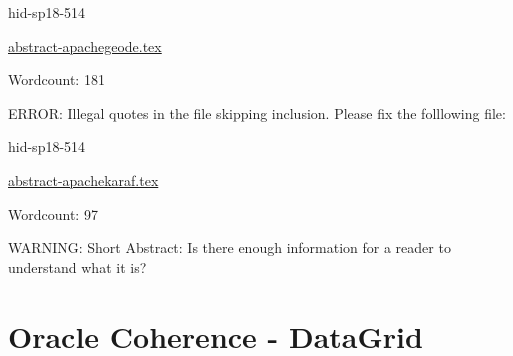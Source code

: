 \begin{IU}

hid-sp18-514

\href{https://github.com/cloudmesh-community/hid-sp18-514/blob/master//technology/abstract-apachegeode.tex}{abstract-apachegeode.tex}

 

Wordcount: 181

\end{IU}

ERROR: Illegal quotes in the file skipping inclusion. Please fix the folllowing file:

\begin{IU}

hid-sp18-514

\href{https://github.com/cloudmesh-community/hid-sp18-514/blob/master//technology/abstract-apachekaraf.tex}{abstract-apachekaraf.tex}

 

Wordcount: 97

WARNING: Short Abstract: Is there enough information for a reader to understand what it is?

\end{IU}

\section{Oracle Coherence - DataGrid}

